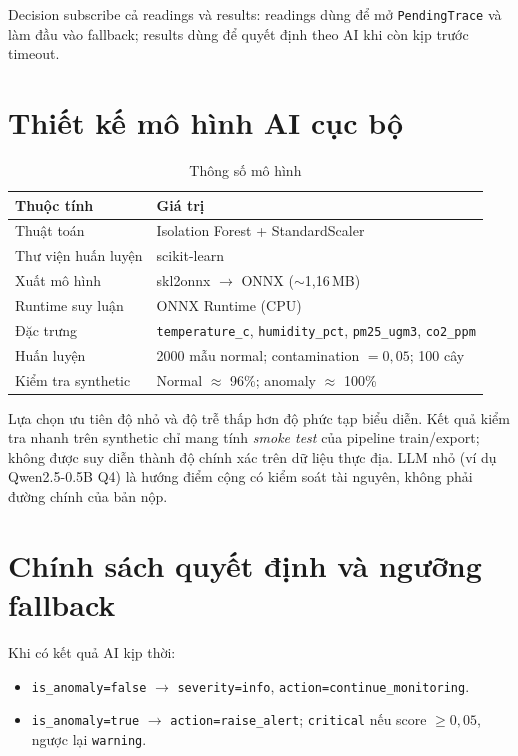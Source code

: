 \documentclass[12pt,a4paper,oneside]{report}
\newcommand{\code}[1]{\texttt{#1}}
\begin{document}
Decision subscribe cả readings và results: readings dùng để mở \code{PendingTrace} và làm đầu vào fallback; results dùng để quyết định theo AI khi còn kịp trước timeout.

\section{Thiết kế mô hình AI cục bộ}

\begin{table}[htbp]
  \centering
  \caption{Thông số mô hình}
  \label{tab:model}
  \begin{tabular}{ll}
    \toprule
    \textbf{Thuộc tính} & \textbf{Giá trị} \\
    \midrule
    Thuật toán & Isolation Forest + StandardScaler \\
    Thư viện huấn luyện & scikit-learn~\cite{pedregosa2011scikit} \\
    Xuất mô hình & skl2onnx $\rightarrow$ ONNX ($\sim$1,16\,MB) \\
    Runtime suy luận & ONNX Runtime (CPU) \\
    Đặc trưng & \code{temperature\_c}, \code{humidity\_pct}, \code{pm25\_ugm3}, \code{co2\_ppm} \\
    Huấn luyện & 2000 mẫu normal; contamination $=0{,}05$; 100 cây \\
    Kiểm tra synthetic & Normal $\approx$ 96\%; anomaly $\approx$ 100\% \\
    \bottomrule
  \end{tabular}
\end{table}

Lựa chọn ưu tiên độ nhỏ và độ trễ thấp hơn độ phức tạp biểu diễn. Kết quả kiểm tra nhanh trên synthetic chỉ mang tính \textit{smoke test} của pipeline train/export; không được suy diễn thành độ chính xác trên dữ liệu thực địa. LLM nhỏ (ví dụ Qwen2.5-0.5B Q4) là hướng điểm cộng có kiểm soát tài nguyên, không phải đường chính của bản nộp.

\section{Chính sách quyết định và ngưỡng fallback}

Khi có kết quả AI kịp thời:
\begin{itemize}
  \item \code{is\_anomaly=false} $\rightarrow$ \code{severity=info}, \code{action=continue\_monitoring}.
  \item \code{is\_anomaly=true} $\rightarrow$ \code{action=raise\_alert}; \code{critical} nếu score $\geq 0{,}05$, ngược lại \code{warning}.
\end{itemize}
\end{document}
